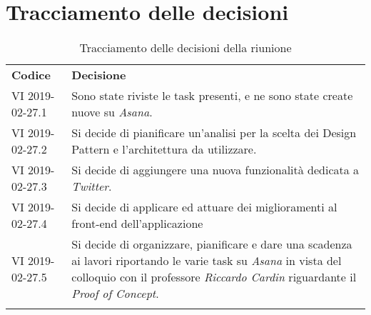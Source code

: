 \clearpage
\section{Tracciamento delle decisioni}
\begin{center}
	\renewcommand{\arraystretch}{1.5}
	\begin{longtable}{  p{2.8cm} p{11.4cm} }
		\rowcolor{tableHeadYellow}
		\textbf{Codice}&\textbf{Decisione}\\
		VI 2019-02-27.1 & Sono state riviste le task presenti, e ne sono state create nuove su \textit{Asana}.\\
		VI 2019-02-27.2 & Si decide di pianificare un'analisi per la scelta dei Design Pattern e l'architettura da utilizzare.\\
		VI 2019-02-27.3 & Si decide di aggiungere una nuova funzionalità dedicata a \textit{Twitter}.\\
		VI 2019-02-27.4 & Si decide di applicare ed attuare dei miglioramenti al front-end dell'applicazione\\
		VI 2019-02-27.5 & Si decide di organizzare, pianificare e dare una scadenza ai lavori riportando le varie task su \textit{Asana} in vista del colloquio con il professore \textit{Riccardo Cardin} riguardante il \textit{Proof of Concept}.\\
		\rowcolor{white}
		\caption{Tracciamento delle decisioni della riunione}
	\end{longtable}	
\end{center}